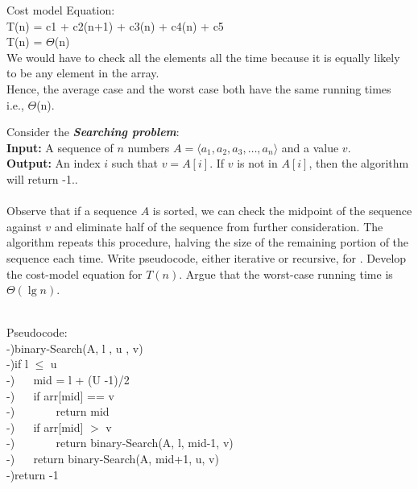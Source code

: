 \documentclass[11pt]{article}
\begin{document}
\begin{questions}
\begin{solutionorbox}
Cost model Equation:\\
T(n) = c1 + c2(n+1) + c3(n) + c4(n) + c5\\
T(n) = $\Theta$(n)\\
We would have to check all the elements all the time because it is equally likely to be any element in the array. \\
Hence, the average case and the worst case both have the same running times i.e.,  $\Theta$(n). \\

\end{solutionorbox}


\ifprintanswers
\newpage
\else
\bigskip
\fi


%
%
\question[10]
Consider the {\bf {\em Searching problem}}:\\
{\bf Input: } A sequence of $n$ numbers $A=\langle a_1, a_2, a_3, \dots, a_n\rangle$ and a value $v$.\\
{\bf Output:} An index $i$ such that $v = A[i]$.  If $v$ is not in $A[i]$, then the algorithm will return -1..\\\\
Observe that if a sequence $A$ is sorted, we can check the midpoint of the sequence against $v$ and eliminate half of the sequence from further consideration.  The  algorithm repeats this procedure, halving the size of the remaining portion of the sequence each time.  Write pseudocode, either iterative or recursive, for .  Develop the cost-model equation for $T(n)$.  Argue that the worst-case running time is $\Theta(\lg n)$.
\begin{solutionorbox} \\
	Pseudocode:\\
	-)binary-Search(A, l , u , v) \\
	-)if l $\leq$ u \\
	 -)$\hspace{20pt}$mid = l + (U -1)/2 \\
	 -)$\hspace{20pt}$if arr[mid] == v \\
	 -)$\hspace{20pt}$ $\hspace{20pt}$return mid \\
	 -)$\hspace{20pt}$if arr[mid]  $>$ v \\
	 -)$\hspace{20pt}$ $\hspace{20pt}$return binary-Search(A, l, mid-1, v) \\
	 -)$\hspace{20pt}$return binary-Search(A, mid+1, u, v) \\
	-)return -1 \\


\end{solutionorbox}
\end{questions}
\end{document}
